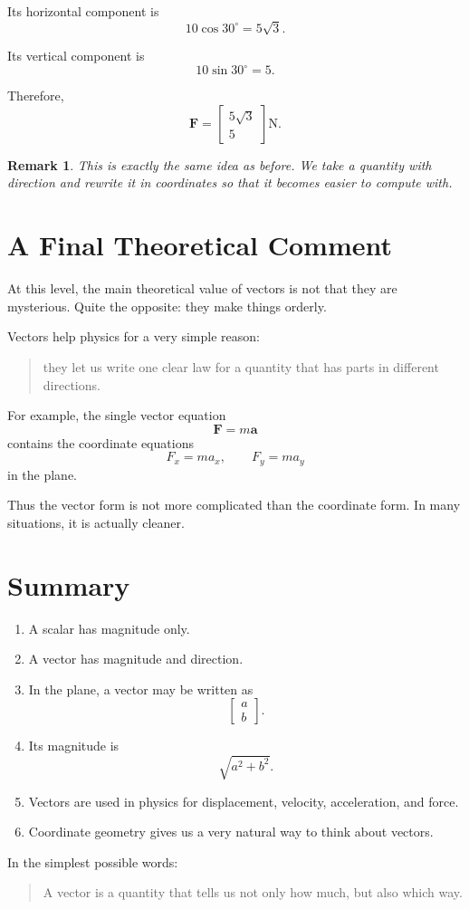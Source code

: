 \documentclass[11pt,a4paper]{article}
\newtheorem{remark}[theorem]{Remark}
\newcommand{\vect}[1]{\boldsymbol{#1}}
\begin{document}
\begin{solutionblock}
Its horizontal component is
\[
10\cos 30^\circ = 5\sqrt{3}.
\]

Its vertical component is
\[
10\sin 30^\circ = 5.
\]

Therefore,
\[
\vect{F} =
\begin{bmatrix}
5\sqrt{3} \\ 5
\end{bmatrix}\mathrm{N}.
\]
\end{solutionblock}

\begin{remark}
This is exactly the same idea as before. We take a quantity with direction and rewrite it
in coordinates so that it becomes easier to compute with.
\end{remark}

\section{A Final Theoretical Comment}

At this level, the main theoretical value of vectors is not that they are mysterious.
Quite the opposite: they make things orderly.

\begin{keypointblock}
Vectors help physics for a very simple reason:

\begin{quote}
they let us write one clear law for a quantity that has parts in different directions.
\end{quote}
\end{keypointblock}

For example, the single vector equation
\[
\vect{F}=m\vect{a}
\]
contains the coordinate equations
\[
F_x=ma_x,
\qquad
F_y=ma_y
\]
in the plane.

Thus the vector form is not more complicated than the coordinate form.
In many situations, it is actually cleaner.

\section{Summary}

\begin{enumerate}[label=\arabic*.]
  \item A scalar has magnitude only.
  \item A vector has magnitude and direction.
  \item In the plane, a vector may be written as
  \[
  \begin{bmatrix}
  a \\ b
  \end{bmatrix}.
  \]
  \item Its magnitude is
  \[
  \sqrt{a^2+b^2}.
  \]
  \item Vectors are used in physics for displacement, velocity, acceleration, and force.
  \item Coordinate geometry gives us a very natural way to think about vectors.
\end{enumerate}

\begin{keypointblock}
In the simplest possible words:

\begin{quote}
A vector is a quantity that tells us not only how much, but also which way.
\end{quote}
\end{keypointblock}
\end{document}
